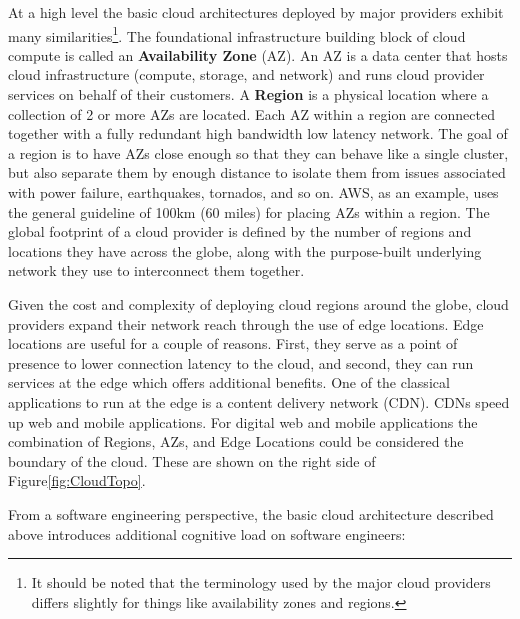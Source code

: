 \documentclass[conference]{IEEEtran}
\begin{document}
At a high level the basic cloud architectures deployed by major providers exhibit many similarities\footnote{It should be noted that the terminology used by the major cloud providers differs slightly for things like availability zones and regions.}.  The foundational infrastructure building block of cloud compute is called an \textbf{Availability Zone} (AZ).  An AZ is a data center that hosts cloud infrastructure (compute, storage, and network) and runs cloud provider services on behalf of their customers.  A \textbf{Region} is a physical location where a collection of 2 or more AZs are located.  Each AZ within a region are connected together with a fully redundant high bandwidth low latency network.  The goal of a region is to have AZs close enough so that they can behave like a single cluster, but also separate them by enough distance to isolate them from issues associated with power failure, earthquakes, tornados, and so on.  AWS, as an example, uses the general guideline of 100km (60 miles)\cite{AWS-AZ} for placing AZs within a region. The global footprint of a cloud provider is defined by the number of regions and locations they have across the globe, along with the purpose-built underlying network they use to interconnect them together. 

Given the cost and complexity of deploying cloud regions around the globe, cloud providers expand their network reach through the use of edge locations.  Edge locations are useful for a couple of reasons. First, they serve as a point of presence to lower connection latency to the cloud, and second, they can run services at the edge which offers additional benefits.  One of the classical applications to run at the edge is a content delivery network (CDN). CDNs speed up web and mobile applications. For digital web and mobile applications the combination of Regions, AZs, and Edge Locations could be considered the boundary of the cloud. These are shown on the right side of Figure\ref{fig:CloudTopo}.      

From a software engineering perspective, the basic cloud architecture described above introduces additional cognitive load on software engineers:
\end{document}
